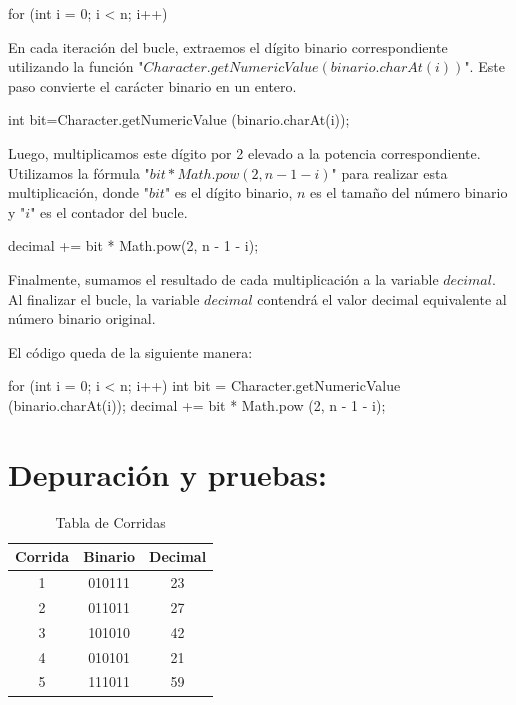 \documentclass{IEEEcsmag}
\begin{document}
\begin{javaCode}
    for (int i = 0; i < n; i++) {
    }
\end{javaCode}

En cada iteración del bucle, extraemos el dígito binario correspondiente utilizando la función "$Character.getNumericValue(binario.charAt(i))$". Este paso convierte el carácter binario en un entero.

\begin{javaCode}
    int bit=Character.getNumericValue
        (binario.charAt(i));
\end{javaCode}

Luego, multiplicamos este dígito por 2 elevado a la potencia correspondiente. Utilizamos la fórmula "$bit * Math.pow(2, n - 1 - i)$" para realizar esta multiplicación, donde "$bit$" es el dígito binario, $n$ es el tamaño del número binario y "$i$" es el contador del bucle.

\begin{javaCode}
decimal += bit * Math.pow(2, n - 1 - i);
\end{javaCode}

Finalmente, sumamos el resultado de cada multiplicación a la variable $decimal$.
Al finalizar el bucle, la variable $decimal$ contendrá el valor decimal equivalente al número binario original.

El código queda de la siguiente manera:
\begin{javaCode}
    for (int i = 0; i < n; i++) {
    int bit = Character.getNumericValue
    (binario.charAt(i));
    decimal += bit * Math.pow
    (2, n - 1 - i);
    }
\end{javaCode}

\section*{Depuración y pruebas:}
 
 \begin{table}[h]
     \centering
     \caption{Tabla de Corridas}
     
     \begin{tabular}{|c|c|c|}
     \hline
        Corrida & Binario & Decimal\\
        \hline
        1  & 010111 & 23\\
        \hline
        2  & 011011 & 27\\
        \hline
        3  & 101010 & 42\\
        \hline
        4  & 010101 & 21\\
        \hline
        5  & 111011 & 59\\
        \hline
     \end{tabular}
     \label{tab:my_label}
 \end{table}
\end{document}
